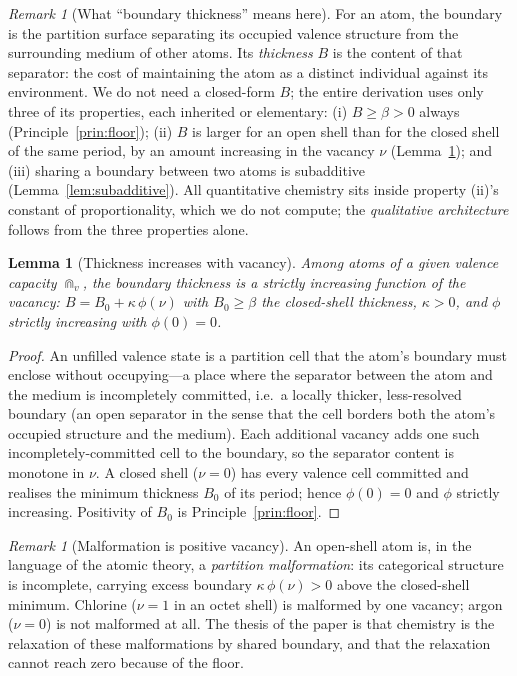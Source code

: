 \documentclass[11pt,twocolumn,a4paper]{article}
\theoremstyle{thmstyle}
\newtheorem{lemma}[theorem]{Lemma}
\theoremstyle{definition}
\theoremstyle{remark}
\newtheorem{remark}[theorem]{Remark}
\newcommand{\floorc}{\beta}
\newcommand{\thick}{B}                 %
\newcommand{\vac}{\nu}                 %
\begin{document}
\begin{remark}[What ``boundary thickness'' means here]
\label{rem:thickness}
For an atom, the boundary is the partition surface separating its
occupied valence structure from the surrounding medium of other atoms. Its
\emph{thickness} $\thick$ is the content of that separator: the cost of
maintaining the atom as a distinct individual against its environment. We
do not need a closed-form $\thick$; the entire derivation uses only three
of its properties, each inherited or elementary: (i) $\thick\ge\floorc>0$
always (Principle~\ref{prin:floor}); (ii) $\thick$ is larger for an open
shell than for the closed shell of the same period, by an amount
increasing in the vacancy $\vac$ (Lemma~\ref{lem:thickness-vacancy}); and
(iii) sharing a boundary between two atoms is subadditive
(Lemma~\ref{lem:subadditive}). All quantitative chemistry sits inside
property (ii)'s constant of proportionality, which we do not compute; the
\emph{qualitative architecture} follows from the three properties alone.
\end{remark}

\begin{lemma}[Thickness increases with vacancy]
\label{lem:thickness-vacancy}
Among atoms of a given valence capacity $\Cap_v$, the boundary thickness
is a strictly increasing function of the vacancy:
$\thick=\thick_{0}+\kappa\,\phi(\vac)$ with $\thick_0\ge\floorc$ the
closed-shell thickness, $\kappa>0$, and $\phi$ strictly increasing with
$\phi(0)=0$.
\end{lemma}

\begin{proof}
An unfilled valence state is a partition cell that the atom's boundary
must enclose without occupying---a place where the separator between the
atom and the medium is incompletely committed, i.e.\ a locally thicker,
less-resolved boundary (an open separator in the sense that the cell
borders both the atom's occupied structure and the medium). Each
additional vacancy adds one such incompletely-committed cell to the
boundary, so the separator content is monotone in $\vac$. A closed shell
($\vac=0$) has every valence cell committed and realises the minimum
thickness $\thick_0$ of its period; hence $\phi(0)=0$ and $\phi$ strictly
increasing. Positivity of $\thick_0$ is Principle~\ref{prin:floor}.
\end{proof}

\begin{remark}[Malformation is positive vacancy]
\label{rem:malformation}
An open-shell atom is, in the language of the atomic theory, a
\emph{partition malformation}: its categorical structure is incomplete,
carrying excess boundary $\kappa\,\phi(\vac)>0$ above the closed-shell
minimum. Chlorine ($\vac=1$ in an octet shell) is malformed by one
vacancy; argon ($\vac=0$) is not malformed at all. The thesis of the
paper is that chemistry is the relaxation of these malformations by
shared boundary, and that the relaxation cannot reach zero because of the
floor.
\end{remark}
\end{document}
